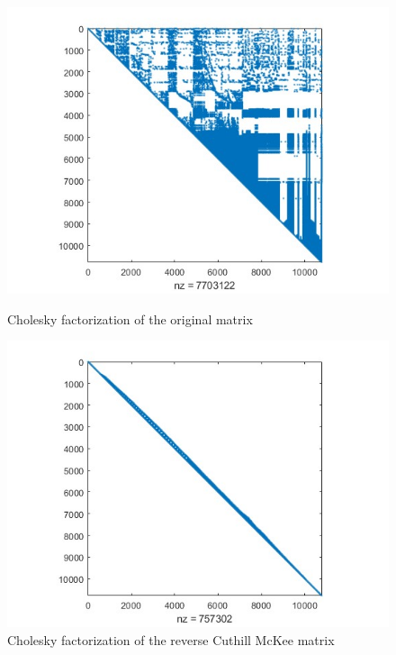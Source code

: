 \documentclass[unicode,11pt,a4paper,oneside,numbers=endperiod,openany]{scrartcl}
\begin{document}
\begin{figure}[H]
    \centering
    \begin{minipage}[b]{0.45\textwidth}
        \centering
        \includegraphics[width=\textwidth]{images/exc5o.jpg}
        \caption{Cholesky factorization of the original matrix}
    \end{minipage}
    \hfill
    \begin{minipage}[b]{0.45\textwidth}
        \centering
        \includegraphics[width=\textwidth]{images/s.jpg}
        \caption{Cholesky factorization of the reverse Cuthill McKee matrix}
    \end{minipage}
\end{figure}
\end{document}
